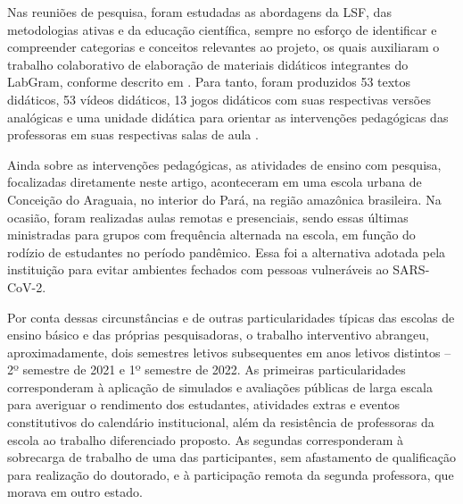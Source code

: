 Nas reuniões de pesquisa, foram estudadas as abordagens da LSF, das
metodologias ativas e da educação científica, sempre no esforço de
identificar e compreender categorias e conceitos relevantes ao projeto,
os quais auxiliaram o trabalho colaborativo de elaboração de materiais
didáticos integrantes do LabGram, conforme descrito em \textcite{silva_desafios_2023}. Para tanto, foram produzidos 53 textos didáticos, 53
vídeos didáticos, 13 jogos didáticos com suas respectivas versões
analógicas e uma unidade didática para orientar as intervenções
pedagógicas das professoras em suas respectivas salas de aula \cite{ribeiro_professores_2021, silva_construcao_2021}.



Ainda sobre as intervenções pedagógicas, as atividades de ensino com
pesquisa, focalizadas diretamente neste artigo, aconteceram em uma
escola urbana de Conceição do Araguaia, no interior do Pará, na região
amazônica brasileira. Na ocasião, foram realizadas aulas remotas e
presenciais, sendo essas últimas ministradas para grupos com frequência
alternada na escola, em função do rodízio de estudantes no período
pandêmico. Essa foi a alternativa adotada pela instituição para evitar
ambientes fechados com pessoas vulneráveis ao SARS-CoV-2.



Por conta dessas circunstâncias e de outras particularidades típicas das
escolas de ensino básico e das próprias pesquisadoras, o trabalho
interventivo abrangeu, aproximadamente, dois semestres letivos
subsequentes em anos letivos distintos -- 2º semestre de 2021 e 1º
semestre de 2022. As primeiras particularidades corresponderam à
aplicação de simulados e avaliações públicas de larga escala para
averiguar o rendimento dos estudantes, atividades extras e eventos
constitutivos do calendário institucional, além da resistência de
professoras da escola ao trabalho diferenciado proposto. As segundas
corresponderam à sobrecarga de trabalho de uma das participantes, sem
afastamento de qualificação para realização do doutorado, e à
participação remota da segunda professora, que morava em outro estado.

